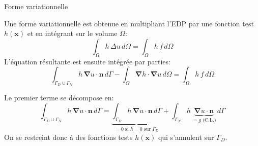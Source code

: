 \documentclass[
mode=present,    %
paper=a4paper,   %
orient=landscape,
display=slides,   %
size=10pt,     %
style=romain   %
]{powerdot}
\begin{document}
\begin{slide}{Forme variationnelle}

Une forme variationnelle est obtenue en multipliant l'EDP par une fonction test $h(\boldsymbol{x})$ et en intégrant sur le volume $\Omega$:
\begin{equation*}
     \int_{\Omega}h\, \Delta u \,d\Omega = \int_{\Omega} h\, f \,d\Omega
\end{equation*}
L'équation résultante est ensuite intégrée par parties:
\begin{equation*}
     \boxed{
     \int_{\Gamma_D \cup \Gamma_N} h\, \boldsymbol{\nabla} u \cdot \boldsymbol{n} \,d\Gamma
          - \int_{\Omega} \boldsymbol{\nabla} h \cdot \boldsymbol{\nabla} u \,d\Omega
     =
     \int_{\Omega} h\, f \,d\Omega
     }
\end{equation*}

\vspace{1cm}

Le premier terme se décompose en:
\begin{equation*}
     \int_{\Gamma_D \cup \Gamma_N} h\, \boldsymbol{\nabla} u \cdot \boldsymbol{n} \,d\Gamma
          =
      \underbrace{\int_{\Gamma_D}h\, \boldsymbol{\nabla} u \cdot \boldsymbol{n} \,d\Gamma}_{= 0 \text{ si $h=0$ sur $\Gamma_D$}}
      +
    \int_{\Gamma_N} h\,\underbrace{\boldsymbol{\nabla} u \cdot \boldsymbol{n}}_{ = g \text{ (C.L.)} } \,d\Gamma
\end{equation*}
On se restreint donc à des fonctions tests $h(\boldsymbol{x})$ qui s'annulent sur $\Gamma_D$.

\end{slide}
\end{document}
